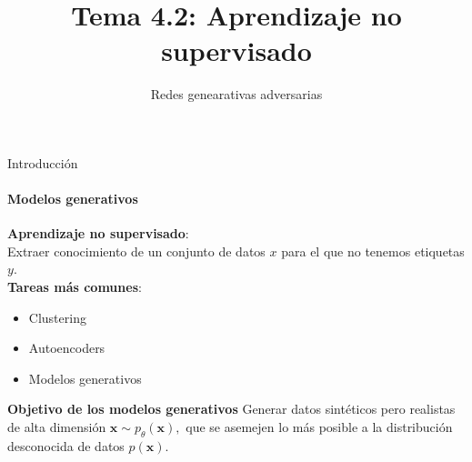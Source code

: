 \documentclass[aspectratio=169]{beamer}
\title{Tema 4.2: Aprendizaje no supervisado}
\subtitle{Redes genearativas adversarias}
\begin{document}
\begin{frame}[plain]
	\titlepage 
\end{frame}

\logo{}

\begin{frame}[t]{Introducción}
	\framesubtitle{Modelos generativos}
	\textbf{Aprendizaje no supervisado}:\\
	Extraer conocimiento de un conjunto de datos $x$ para el que no tenemos etiquetas $y$.\\
	\vspace{.4cm}
	\textbf{Tareas más comunes}:
	\begin{itemize}
		\item Clustering
		\item Autoencoders
		\item Modelos generativos
	\end{itemize}
	\vspace{.4cm}
	\begin{block}{\textbf{Objetivo de los modelos generativos}}
		Generar datos sintéticos pero realistas de alta dimensión $\mathbf{x} \sim p_{\theta}(\mathbf{x}),$ que se asemejen lo más posible a la distribución desconocida de datos $p(\mathbf{x})$.
	\end{block}

\end{frame}
\end{document}
